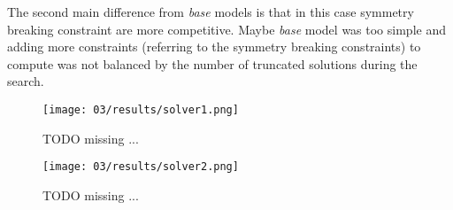 The second main difference from \textit{base} models is that in this case symmetry breaking constraint are more competitive. 
Maybe \textit{base} model was too simple and adding more constraints (referring to the symmetry breaking constraints) to 
compute was not balanced by the number of truncated solutions during the search.

\begin{figure}[H]
  \centering
  \texttt{[image: 03/results/solver1.png]}
  \caption{
    \colorbox{BurntOrange}{TODO missing ...}
  }
  \label{fig:CP_results_solver1}
\end{figure}
\begin{figure}[H]
  \centering
  \texttt{[image: 03/results/solver2.png]}
  \caption{
    \colorbox{BurntOrange}{TODO missing ...}
  }
  \label{fig:CP_results_solver2}
\end{figure}
